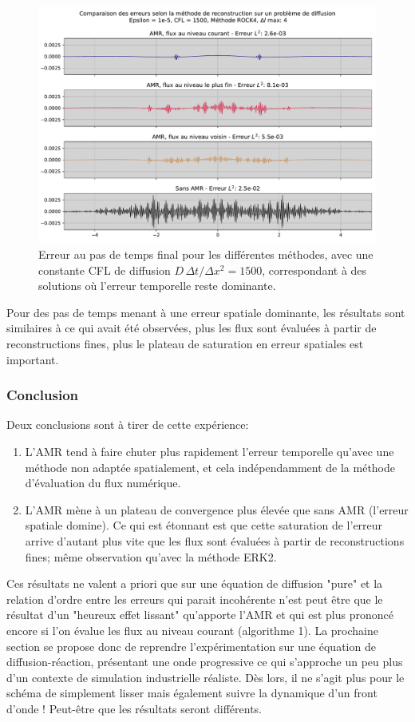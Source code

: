     \begin{figure}[h!]
    \centering
    \includegraphics[width=\textwidth]{media/4_travail/3/Error_comparaison_according_to_flux_reconstruction_method.pdf}
    \caption{Erreur au pas de temps final pour les différentes méthodes, avec une constante CFL de diffusion $D\,\Delta t / \Delta x^2 = 1500$, correspondant à des solutions où l'erreur temporelle reste dominante.}
    \label{fig:flux_reconstruction_error}
    \end{figure}

    Pour des pas de temps menant à une erreur spatiale dominante, les résultats sont similaires à ce qui avait été observées, plus les flux sont évaluées à partir de reconstructions fines, 
    plus le plateau de saturation en erreur spatiales est important.
    \subsubsection{Conclusion}
    Deux conclusions sont à tirer de cette expérience:
    \begin{enumerate}
        \item L'AMR tend à faire chuter plus rapidement l'erreur temporelle qu'avec une méthode non adaptée spatialement, et cela indépendamment de la méthode d'évaluation du flux numérique.
        \item L'AMR mène à un plateau de convergence plus élevée que sans AMR (l'erreur spatiale domine). Ce qui est étonnant est que cette saturation de l'erreur arrive d'autant plus vite que les flux sont évaluées à partir de reconstructions fines; même observation qu'avec la méthode ERK2.
    \end{enumerate}
    Ces résultats ne valent a priori que sur une équation de diffusion "pure" et la relation d'ordre entre les erreurs qui parait incohérente n'est peut être que le résultat d'un 
    "heureux effet lissant" qu'apporte l'AMR et qui est plus prononcé encore si l'on évalue les flux au niveau courant (algorithme 1).
    La prochaine section se propose donc de reprendre l'expérimentation sur une équation de diffusion-réaction, présentant une onde progressive ce qui s'approche un peu plus
    d'un contexte de simulation industrielle réaliste.
    Dès lors, il ne s'agit plus pour le schéma de simplement lisser mais également suivre la dynamique d'un front d'onde ! Peut-être que les résultats seront différents.